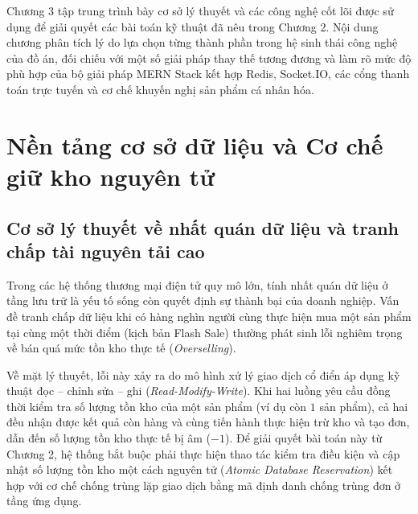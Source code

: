 \documentclass[../DoAn.tex]{subfiles}
\begin{document}
Chương 3 tập trung trình bày cơ sở lý thuyết và các công nghệ cốt lõi được sử dụng để giải quyết các bài toán kỹ thuật đã nêu trong Chương 2. Nội dung chương phân tích lý do lựa chọn từng thành phần trong hệ sinh thái công nghệ của đồ án, đối chiếu với một số giải pháp thay thế tương đương và làm rõ mức độ phù hợp của bộ giải pháp MERN Stack kết hợp Redis, Socket.IO, các cổng thanh toán trực tuyến và cơ chế khuyến nghị sản phẩm cá nhân hóa.

\section{Nền tảng cơ sở dữ liệu và Cơ chế giữ kho nguyên tử}
\label{section:3.1}

\subsection{Cơ sở lý thuyết về nhất quán dữ liệu và tranh chấp tài nguyên tải cao}
Trong các hệ thống thương mại điện tử quy mô lớn, tính nhất quán dữ liệu ở tầng lưu trữ là yếu tố sống còn quyết định sự thành bại của doanh nghiệp. Vấn đề tranh chấp dữ liệu khi có hàng nghìn người cùng thực hiện mua một sản phẩm tại cùng một thời điểm (kịch bản Flash Sale) thường phát sinh lỗi nghiêm trọng về bán quá mức tồn kho thực tế (\textit{Overselling}).

Về mặt lý thuyết, lỗi này xảy ra do mô hình xử lý giao dịch cổ điển áp dụng kỹ thuật đọc -- chỉnh sửa -- ghi (\textit{Read-Modify-Write}). Khi hai luồng yêu cầu đồng thời kiểm tra số lượng tồn kho của một sản phẩm (ví dụ còn $1$ sản phẩm), cả hai đều nhận được kết quả còn hàng và cùng tiến hành thực hiện trừ kho và tạo đơn, dẫn đến số lượng tồn kho thực tế bị âm ($-1$). Để giải quyết bài toán này từ Chương 2, hệ thống bắt buộc phải thực hiện thao tác kiểm tra điều kiện và cập nhật số lượng tồn kho một cách nguyên tử (\textit{Atomic Database Reservation}) kết hợp với cơ chế chống trùng lặp giao dịch bằng mã định danh chống trùng đơn ở tầng ứng dụng.
\end{document}
